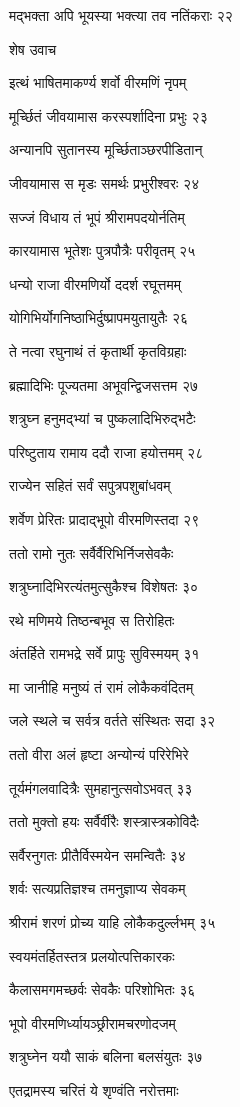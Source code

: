 मद्भक्ता अपि भूयस्या भक्त्या तव नतिंकराः २२

शेष उवाच

इत्थं भाषितमाकर्ण्य शर्वो वीरमणिं नृपम्

मूर्च्छितं जीवयामास करस्पर्शादिना प्रभुः २३

अन्यानपि सुतानस्य मूर्च्छिताञ्छरपीडितान्

जीवयामास स मृडः समर्थः प्रभुरीश्वरः २४

सज्जं विधाय तं भूपं श्रीरामपदयोर्नतिम्

कारयामास भूतेशः पुत्रपौत्रैः परीवृतम् २५

धन्यो राजा वीरमणिर्यो ददर्श रघूत्तमम्

योगिभिर्योगनिष्ठाभिर्दुष्प्रापमयुतायुतैः २६

ते नत्वा रघुनाथं तं कृतार्थी कृतविग्रहाः

ब्रह्मादिभिः पूज्यतमा अभूवन्द्विजसत्तम २७

शत्रुघ्न हनुमद्भ्यां च पुष्कलादिभिरुद्भटैः

परिष्टुताय रामाय ददौ राजा हयोत्तमम् २८

राज्येन सहितं सर्वं सपुत्रपशुबांधवम्

शर्वेण प्रेरितः प्रादाद्भूपो वीरमणिस्तदा २९

ततो रामो नुतः सर्वैर्वैरिभिर्निजसेवकैः

शत्रुघ्नादिभिरत्यंतमुत्सुकैश्च विशेषतः ३०

रथे मणिमये तिष्ठन्बभूव स तिरोहितः

अंतर्हिते रामभद्रे सर्वे प्रापुः सुविस्मयम् ३१

मा जानीहि मनुष्यं तं रामं लोकैकवंदितम्

जले स्थले च सर्वत्र वर्तते संस्थितः सदा ३२

ततो वीरा अलं हृष्टा अन्योन्यं परिरेभिरे

तूर्यमंगलवादित्रैः सुमहानुत्सवोऽभवत् ३३

ततो मुक्तो हयः सर्वैर्वीरैः शस्त्रास्त्रकोविदैः

सर्वैरनुगतः प्रीतैर्विस्मयेन समन्वितैः ३४

शर्वः सत्यप्रतिज्ञश्च तमनुज्ञाप्य सेवकम्

श्रीरामं शरणं प्रोच्य याहि लोकैकदुर्ल्लभम् ३५

स्वयमंतर्हितस्तत्र प्रलयोत्पत्तिकारकः

कैलासमगमच्छर्वः सेवकैः परिशोभितः ३६

भूपो वीरमणिर्ध्यायञ्छ्रीरामचरणोदजम्

शत्रुघ्नेन ययौ साकं बलिना बलसंयुतः ३७

एतद्रामस्य चरितं ये शृण्वंति नरोत्तमाः

